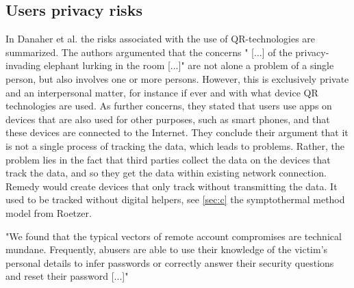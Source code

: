 

\subsection{Users privacy risks}
In Danaher et al. \cite{doi:10.1080/15265161.2017.1422294} the risks associated with the use of \acs{QR}-technologies are summarized.
The authors argumented that the concerns " [...] of the privacy-invading elephant lurking in the room [...]" are not alone a problem of a single person, but also involves one or more persons. However, this is exclusively private and an interpersonal matter, for instance if ever and with what device \acs{QR} technologies are used.
As further concerns, they stated that users use apps on devices that are also used for other purposes, such as smart phones, and that these devices are connected to the Internet. 
They conclude their argument that it is not a single process of tracking the data, which leads to problems. Rather, the problem lies in the fact that third parties collect the data on the devices that track the data, and so they get the data within existing network connection.
Remedy would create devices that only track without transmitting the data.
It used to be tracked without digital helpers, see  \ref{sec:c} the symptothermal method model from Roetzer.

"We found that the typical vectors of remote account compromises are technical mundane. Frequently, abusers are able to use their knowledge of the victim's personal details to infer passwords or correctly answer their security questions and reset their password [...]" \cite{freed2018stalker}
